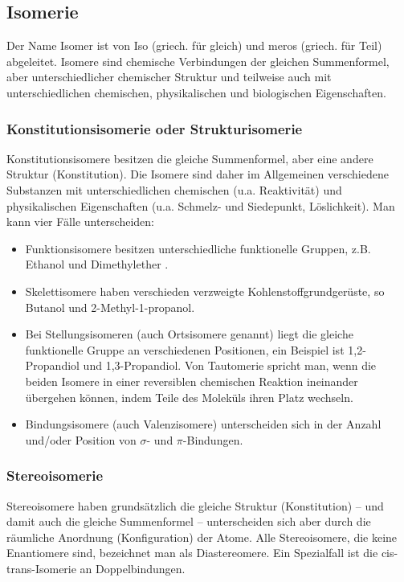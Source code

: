 \documentclass[a4paper]{report}
\begin{document}
\subsection{Isomerie}
Der Name Isomer ist von Iso (griech. für gleich) und meros (griech. für Teil) abgeleitet. 
Isomere sind chemische Verbindungen der gleichen Summenformel, aber unterschiedlicher chemischer Struktur und teilweise auch mit unterschiedlichen chemischen, physikalischen und biologischen Eigenschaften.

\subsubsection{Konstitutionsisomerie oder Strukturisomerie}
Konstitutionsisomere besitzen die gleiche Summenformel, aber eine andere Struktur (Konstitution). Die Isomere sind daher im Allgemeinen verschiedene Substanzen mit unterschiedlichen chemischen (u.a. Reaktivität) und physikalischen Eigenschaften (u.a. Schmelz- und Siedepunkt, Löslichkeit). Man kann vier Fälle unterscheiden: 
\begin{itemize}
    \item Funktionsisomere besitzen unterschiedliche funktionelle Gruppen, z.B. Ethanol { } und Dimethylether { }.
    \item Skelettisomere haben verschieden verzweigte Kohlenstoffgrundgerüste, so Butanol und 2-Methyl-1-propanol. 
    \item Bei Stellungsisomeren (auch Ortsisomere genannt) liegt die gleiche funktionelle Gruppe an verschiedenen Positionen, ein Beispiel ist 1,2-Propandiol und 1,3-Propandiol. Von Tautomerie spricht man, wenn die beiden Isomere in einer reversiblen chemischen Reaktion ineinander übergehen können, indem Teile des Moleküls ihren Platz wechseln.
    \item Bindungsisomere (auch Valenzisomere) unterscheiden sich in der Anzahl und/oder Position von $\sigma$- und $\pi$-Bindungen.  
\end{itemize}

\subsubsection{Stereoisomerie}
Stereoisomere haben grundsätzlich die gleiche Struktur (Konstitution) -- und damit auch die gleiche Summenformel -- unterscheiden sich aber durch die räumliche Anordnung (Konfiguration) der Atome. 
Alle Stereoisomere, die keine Enantiomere sind, bezeichnet man als Diastereomere. Ein Spezialfall ist die cis-trans-Isomerie an Doppelbindungen. 
\end{document}
